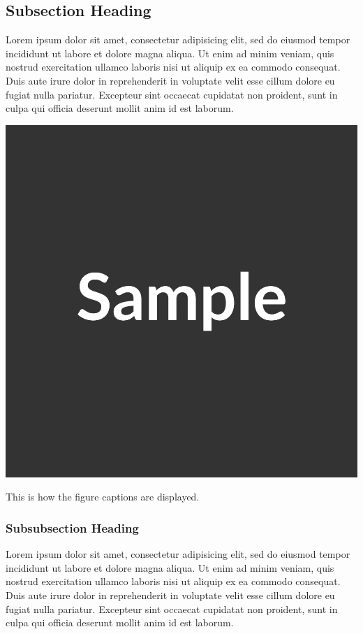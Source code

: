 \documentclass[11pt]{salam}
\begin{document}
\subsection{Subsection Heading}
Lorem ipsum dolor sit amet, consectetur adipisicing elit, sed do eiusmod tempor incididunt ut labore et dolore magna aliqua. Ut enim ad minim veniam, quis nostrud exercitation ullamco laboris nisi ut aliquip ex ea commodo consequat. Duis aute irure dolor in reprehenderit in voluptate velit esse cillum dolore eu fugiat nulla pariatur. Excepteur sint occaecat cupidatat non proident, sunt in culpa qui officia deserunt mollit anim id est laborum.
\begin{marginfigure}%
  \includegraphics[width=\marginparwidth]{1000.png}
  \caption{This is how the figure captions are displayed.}
\end{marginfigure}

  \subsubsection{Subsubsection Heading}
  Lorem ipsum dolor sit amet, consectetur adipisicing elit, sed do eiusmod tempor incididunt ut labore et dolore magna aliqua. Ut enim ad minim veniam, quis nostrud exercitation ullamco laboris nisi ut aliquip ex ea commodo consequat. Duis aute irure dolor in reprehenderit in voluptate velit esse cillum dolore eu fugiat nulla pariatur. Excepteur sint occaecat cupidatat non proident, sunt in culpa qui officia deserunt mollit anim id est laborum.
\end{document}
